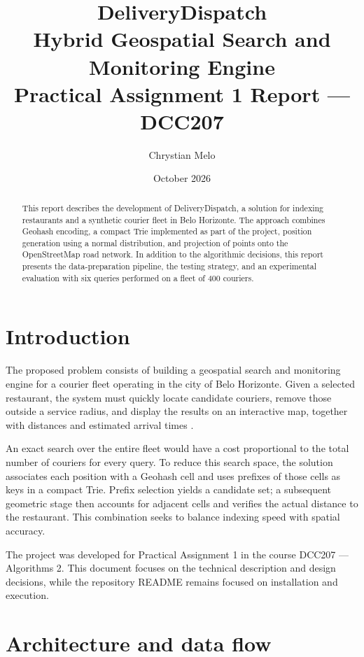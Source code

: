 \documentclass[12pt,a4paper]{article}
\title{DeliveryDispatch\\
\large Hybrid Geospatial Search and Monitoring Engine\\
\large Practical Assignment 1 Report --- DCC207}
\author{Chrystian Melo}
\date{October 2026}
\begin{document}
\maketitle
\thispagestyle{empty}

\begin{abstract}
This report describes the development of DeliveryDispatch, a solution for
indexing restaurants and a synthetic courier fleet in Belo Horizonte. The
approach combines Geohash encoding, a compact Trie implemented as part of the
project, position generation using a normal distribution, and projection of
points onto the OpenStreetMap road network. In addition to the algorithmic
decisions, this report presents the data-preparation pipeline, the testing
strategy, and an experimental evaluation with six queries performed on a fleet
of 400 couriers.
\end{abstract}

\clearpage
\begingroup
\normalsize
\renewcommand{\baselinestretch}{0.86}\selectfont
\setlength{\parskip}{0pt}
\tableofcontents
\endgroup
\clearpage

\section{Introduction}

The proposed problem consists of building a geospatial search and monitoring
engine for a courier fleet operating in the city of Belo Horizonte. Given a
selected restaurant, the system must quickly locate candidate couriers, remove
those outside a service radius, and display the results on an interactive map,
together with distances and estimated arrival times \cite{enunciado}.

An exact search over the entire fleet would have a cost proportional to the
total number of couriers for every query. To reduce this search space, the
solution associates each position with a Geohash cell and uses prefixes of
those cells as keys in a compact Trie. Prefix selection yields a candidate set;
a subsequent geometric stage then accounts for adjacent cells and verifies the
actual distance to the restaurant. This combination seeks to balance indexing
speed with spatial accuracy.

The project was developed for Practical Assignment 1 in the course
DCC207 --- Algorithms 2. This document focuses on the technical description and
design decisions, while the repository README remains focused on installation
and execution.

\section{Architecture and data flow}
\end{document}
